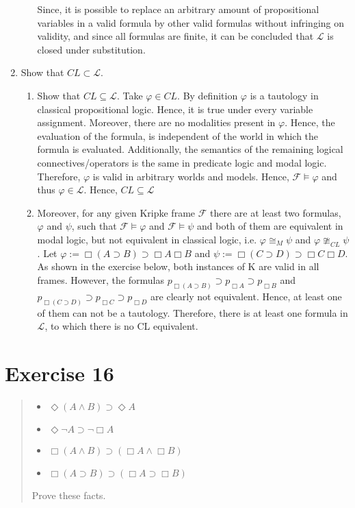 \documentclass[11pt,a4paper]{article}
\newcommand{\lto}{\supset}
\newcommand{\some}{\Diamond}
\newcommand{\all}{\Box}
\begin{document}
\begin{enumerate}
\begin{enumerate}
Since, it is possible to replace an arbitrary amount of propositional variables in a valid formula by other valid formulas without infringing on validity, and since all formulas are finite, it can be concluded that $\mathcal{L}$ is closed under substitution.
\end{enumerate}

\item Show that $CL \subset \mathcal{L}$.
\begin{enumerate}
\item Show that $CL \subseteq \mathcal{L}$. Take $\varphi \in CL$. By definition $\varphi$ is a tautology in classical propositional logic. Hence, it is true under every variable assignment.  Moreover, there are no modalities present in $\varphi$. Hence, the evaluation of the formula, is independent of the world in which the formula is evaluated. Additionally, the semantics of the remaining logical connectives/operators is the same in predicate logic and modal logic. Therefore, $\varphi$ is valid in arbitrary worlds and models. Hence, $\mathcal{F} \models \varphi$ and thus $\varphi \in \mathcal{L}$. Hence, $CL \subseteq \mathcal{L}$ \\

\item Moreover, for any given Kripke frame $\mathcal{F}$ there are at least two formulas, $\varphi$ and $\psi$, such that $\mathcal{F} \models \varphi$ and $\mathcal{F} \models \psi$ and both of them are equivalent in modal logic, but not equivalent in classical logic, i.e. $\varphi \cong_M \psi$ and $\varphi \ncong_{CL} \psi$. Let $\varphi:= \all(A \lto B) \lto \all A \all B$ and $\psi:= \all(C \lto D) \lto \all C \all D$. As shown in the exercise below, both instances of K are valid in all frames. However, the formulas $p_{\all(A \lto B)} \lto p_{\all A} \lto p_{\all B}$ and  $p_{\all(C \lto D)} \lto p_{\all C} \lto p_{\all D}$ are clearly not equivalent. Hence, at least one of them can not be a tautology. Therefore, there is at least one formula in $\mathcal{L}$, to which there is no CL equivalent.
\end{enumerate}


\end{enumerate}


\section*{Exercise 16}
\begin{quote}
\begin{itemize}
\item $\some (A \land B) \lto \some  A$
\item $\some \neg A \lto  \neg \all  A$
\item $\all (A \land B) \lto (\all A \land \all B) $
\item $\all (A \lto B) \lto (\all A \lto \all B) $
\end{itemize}
Prove these facts.
\end{quote}
\end{document}
